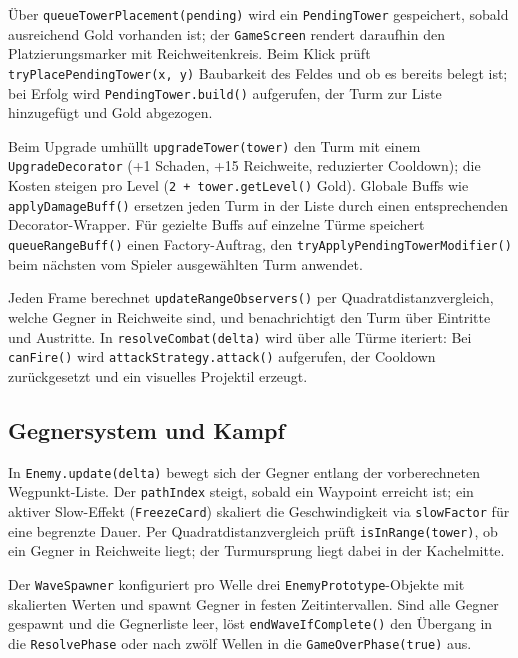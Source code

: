 Über \texttt{queue\-Tower\-Placement(pending)} wird ein \texttt{PendingTower} gespeichert,
sobald ausreichend Gold vorhanden ist; der \texttt{GameScreen} rendert daraufhin
den Platzierungsmarker mit Reichweitenkreis. Beim Klick prüft \texttt{tryPlace\-Pending\-Tower(x, y)}
Baubarkeit des Feldes und ob es bereits belegt ist; bei Erfolg wird
\texttt{PendingTower.build()} aufgerufen, der Turm zur Liste hinzugefügt und Gold
abgezogen.

Beim Upgrade umhüllt \texttt{upgradeTower(tower)} den Turm mit einem
\texttt{UpgradeDecorator} (+1 Schaden, +15 Reichweite, reduzierter Cooldown); die
Kosten steigen pro Level (\texttt{2 + tower.getLevel()} Gold). Globale Buffs wie
\texttt{applyDamageBuff()} ersetzen jeden Turm in der Liste durch einen
entsprechenden Decorator-Wrapper. Für gezielte Buffs auf einzelne Türme speichert
\texttt{queueRangeBuff()} einen Factory-Auftrag, den
\texttt{tryApply\-Pending\-Tower\-Modifier()} beim nächsten vom Spieler ausgewählten
Turm anwendet.

Jeden Frame berechnet \texttt{update\-Range\-Observers()} per Quadratdistanzvergleich,
welche Gegner in Reichweite sind, und benachrichtigt den Turm über
Eintritte und Austritte. In \texttt{resolveCombat(delta)} wird über alle Türme
iteriert:
Bei \texttt{canFire()} wird \texttt{attack\-Strategy.attack()} aufgerufen, der
Cooldown zurückgesetzt und ein visuelles Projektil erzeugt.

\subsection{Gegnersystem und Kampf}

In \texttt{Enemy.update(delta)} bewegt sich der Gegner entlang der vorberechneten
Wegpunkt-Liste. Der \texttt{pathIndex} steigt, sobald ein Waypoint erreicht ist;
ein aktiver Slow-Effekt (\texttt{FreezeCard}) skaliert die Geschwindigkeit via
\texttt{slowFactor} für eine begrenzte Dauer. Per Quadratdistanzvergleich prüft \texttt{isInRange(tower)},
ob ein Gegner in Reichweite liegt; der Turmursprung liegt dabei in der
Kachelmitte.

Der \texttt{WaveSpawner} konfiguriert pro Welle drei
\texttt{EnemyPrototype}-Objekte mit skalierten Werten und spawnt Gegner in festen
Zeitintervallen. Sind alle Gegner gespawnt und die Gegnerliste leer, löst
\texttt{endWaveIfComplete()} den Übergang in die \texttt{ResolvePhase} oder
nach zwölf Wellen in die \texttt{GameOverPhase(true)} aus.

